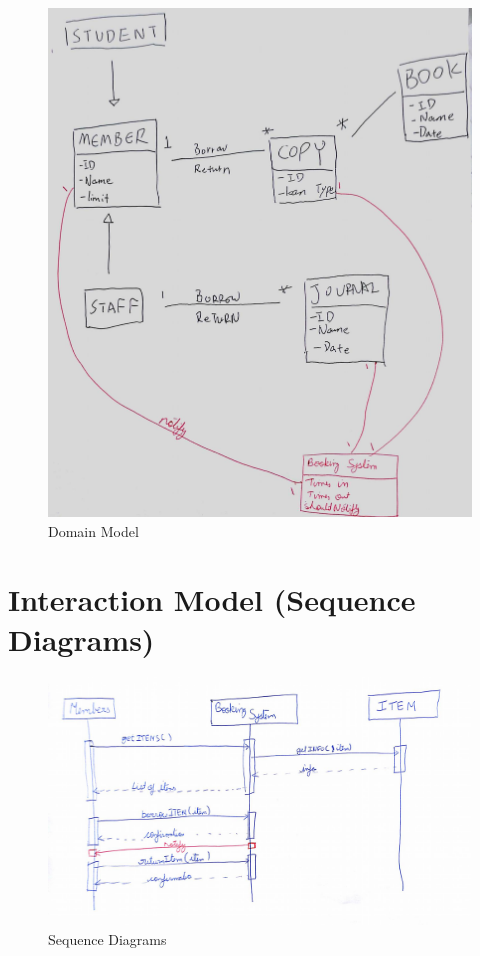 \documentclass[12pt]{article}
\begin{document}
\begin{figure}[!htb]
    \includegraphics[width=\linewidth]{02-domain-model.jpg}
    \caption{Domain Model}
\end{figure}

\section{Interaction Model (Sequence Diagrams)}

\begin{figure}[!htb]
    \includegraphics[width=\linewidth]{03-interaction.jpg}
    \caption{Sequence Diagrams}
\end{figure}
\end{document}

